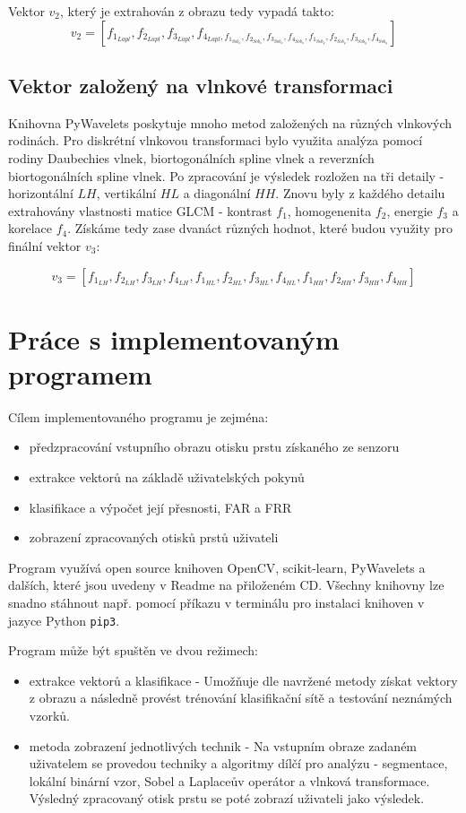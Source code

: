 Vektor $v_2$, který je extrahován z obrazu tedy vypadá takto:
$$v_2 = [f_{1_{Lapl}}, f_{2_{Lapl}}, f_{3_{Lapl}}, f_{4_{Lapl}, f_{1_{Sob_x}}, f_{2_{Sob_x}}, f_{3_{Sob_x}}, f_{4_{Sob_x}}, f_{1_{Sob_y}}, f_{2_{Sob_y}}, f_{3_{Sob_y}}, f_{4_{Sob_y}}}]$$

\subsection{Vektor založený na vlnkové transformaci}
Knihovna PyWavelets poskytuje mnoho metod založených na různých vlnkových rodinách. Pro diskrétní vlnkovou transformaci bylo využita analýza pomocí rodiny Daubechies vlnek, biortogonálních spline vlnek a reverzních biortogonálních spline vlnek. Po zpracování je výsledek rozložen na tři detaily - horizontální $LH$, vertikální $HL$ a diagonální $HH$. Znovu byly z každého detailu extrahovány vlastnosti matice GLCM - kontrast $f_1$, homogenenita $f_2$, energie $f_3$ a korelace $f_4$. Získáme tedy zase dvanáct různých hodnot, které budou využity pro finální vektor $v_3$:

$$v_3 = [f_{1_{LH}}, f_{2_{LH}}, f_{3_{LH}}, f_{4_{LH}}, f_{1_{HL}}, f_{2_{HL}}, f_{3_{HL}}, f_{4_{HL}}, f_{1_{HH}}, f_{2_{HH}}, f_{3_{HH}}, f_{4_{HH}}]$$

\section{Práce s implementovaným programem}
Cílem implementovaného programu je zejména:
\begin{itemize}
    \item předzpracování vstupního obrazu otisku prstu získaného ze senzoru
    \item extrakce vektorů na základě uživatelských pokynů
    \item klasifikace a výpočet její přesnosti, FAR a FRR
    \item zobrazení zpracovaných otisků prstů uživateli
\end{itemize}

Program využívá open source knihoven OpenCV, scikit-learn, PyWavelets a dalších, které jsou uvedeny v Readme na přiloženém CD. Všechny knihovny lze snadno stáhnout např. pomocí příkazu v terminálu pro instalaci knihoven v jazyce Python \verb|pip3|. 

Program může být spuštěn ve dvou režimech:
\begin{itemize}
    \item extrakce vektorů a klasifikace - Umožňuje dle navržené metody získat vektory z obrazu a následně provést trénování klasifikační sítě a testování neznámých vzorků.
    \item metoda zobrazení jednotlivých technik - Na vstupním obraze zadaném uživatelem se provedou techniky a algoritmy dílčí pro analýzu - segmentace, lokální binární vzor, Sobel a Laplaceův operátor a vlnková transformace. Výsledný zpracovaný otisk prstu se poté zobrazí uživateli jako výsledek.
\end{itemize}


